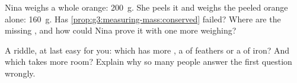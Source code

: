 \begin{exercise}[$\star\star$]\label{exo:g3:measuring-mass:10}
Nina weighs a whole orange: \qty{200}{g}. She peels it and weighs
the peeled orange alone: \qty{160}{g}. Has
\cref{prop:g3:measuring-mass:conserved} failed? Where are the
missing , and how could Nina prove it with one more weighing?
\end{exercise}

\begin{exercise}[$\star\star$]\label{exo:g3:measuring-mass:11}
A riddle, at last easy for you: which has more , a  of
feathers or a  of iron? And which takes more room? Explain
why so many people answer the first question wrongly.
\end{exercise}
